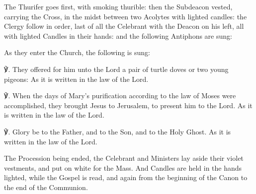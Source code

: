 \begin{rubric}
    The Thurifer goes first, with smoking thurible: then the Subdeacon vested, carrying the Cross, in the midst between two Acolytes with lighted candles: the Clergy follow in order, last of all the Celebrant with the Deacon on his left, all with lighted Candles in their hands: and the following Antiphons are sung:
\end{rubric}



\begin{rubric}
    As they enter the Church, the following is sung:
\end{rubric}

℣. They offered for him unto the Lord a pair of turtle doves or two young pigeons: As it is written in the law of the Lord.

℣. When the days of Mary's purification according to the law of Moses were accomplished, they brought Jesus to Jerusalem, to present him to the Lord. As it is written in the law of the Lord.

℣. Glory be to the Father, and to the Son, and to the Holy Ghost. As it is written in the law of the Lord.

\begin{rubric}
    The Procession being ended, the Celebrant and Ministers lay aside their violet vestments, and put on white for the Mass. And Candles are held in the hands lighted, while the Gospel is read, and again from the beginning of the Canon to the end of the Communion.
\end{rubric}

